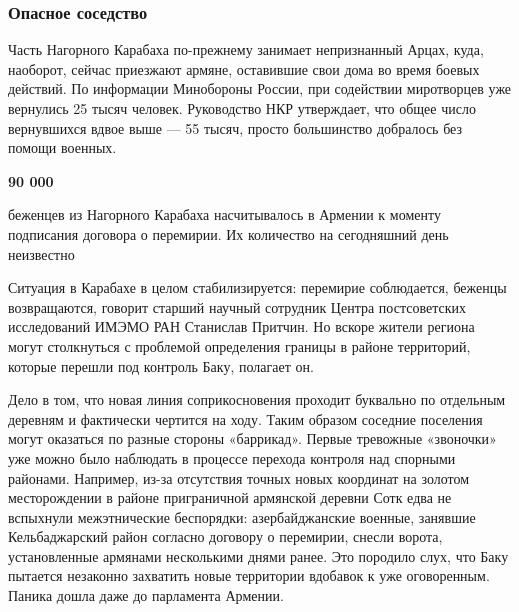  
 
 
 
 
\subsubsection{Опасное соседство}
\label{sec:02_12_2020.news.ru.lenta_ru.1.karabah.opasnoje_sosedstvo}

Часть Нагорного Карабаха по-прежнему занимает непризнанный Арцах, куда,
наоборот, сейчас приезжают армяне, оставившие свои дома во время боевых
действий. По информации Минобороны России, при содействии миротворцев уже
вернулись 25 тысяч человек. Руководство НКР утверждает, что общее число
вернувшихся вдвое выше --- 55 тысяч, просто большинство добралось без помощи
военных.

\begin{leftbar}
	\bfseries
{\centering\color{orange}\Huge 90 000}\par
беженцев из Нагорного Карабаха насчитывалось в Армении к моменту подписания
договора о перемирии. Их количество на сегодняшний день неизвестно
\end{leftbar}

Ситуация в Карабахе в целом стабилизируется: перемирие соблюдается, беженцы
возвращаются, говорит старший научный сотрудник Центра постсоветских
исследований ИМЭМО РАН Станислав Притчин. Но вскоре жители региона могут
столкнуться с проблемой определения границы в районе территорий, которые
перешли под контроль Баку, полагает он.

Дело в том, что новая линия соприкосновения проходит буквально по отдельным
деревням и фактически чертится на ходу. Таким образом соседние поселения могут
оказаться по разные стороны «баррикад». Первые тревожные «звоночки» уже можно
было наблюдать в процессе перехода контроля над спорными районами. Например,
из-за отсутствия точных новых координат на золотом месторождении в районе
приграничной армянской деревни Сотк едва не вспыхнули межэтнические беспорядки:
азербайджанские военные, занявшие Кельбаджарский район согласно договору о
перемирии, снесли ворота, установленные армянами несколькими днями ранее. Это
породило слух, что Баку пытается незаконно захватить новые территории вдобавок
к уже оговоренным. Паника дошла даже до парламента Армении.

